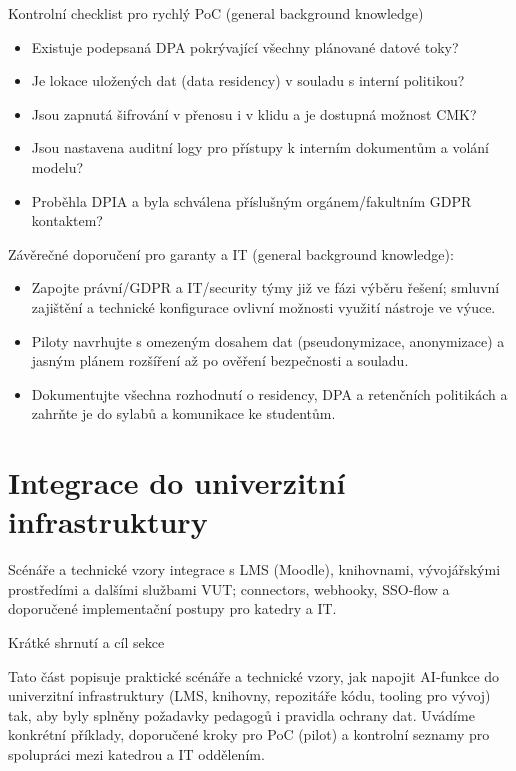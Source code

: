 \documentclass{report}%
\begin{document}
Kontrolní checklist pro rychlý PoC (general background knowledge)
\begin{itemize}
  \item Existuje podepsaná DPA pokrývající všechny plánované datové toky?
  \item Je lokace uložených dat (data residency) v souladu s interní politikou?
  \item Jsou zapnutá šifrování v přenosu i v klidu a je dostupná možnost CMK?
  \item Jsou nastavena auditní logy pro přístupy k interním dokumentům a volání modelu?
  \item Proběhla DPIA a byla schválena příslušným orgánem/fakultním GDPR kontaktem?
\end{itemize}

Závěrečné doporučení pro garanty a IT (general background knowledge):
\begin{itemize}
  \item Zapojte právní/GDPR a IT/security týmy již ve fázi výběru řešení; smluvní zajištění a technické konfigurace ovlivní možnosti využití nástroje ve výuce.
  \item Piloty navrhujte s omezeným dosahem dat (pseudonymizace, anonymizace) a jasným plánem rozšíření až po ověření bezpečnosti a souladu.
  \item Dokumentujte všechna rozhodnutí o residency, DPA a retenčních politikách a zahrňte je do sylabů a komunikace ke studentům.
\end{itemize}%

%
\section{Integrace do univerzitní infrastruktury}%
Scénáře a technické vzory integrace s LMS (Moodle), knihovnami, vývojářskými prostředími a dalšími službami VUT; connectors, webhooky, SSO‑flow a doporučené implementační postupy pro katedry a IT.%


%
Krátké shrnutí a cíl sekce

Tato část popisuje praktické scénáře a technické vzory, jak napojit AI‑funkce do univerzitní infrastruktury (LMS, knihovny, repozitáře kódu, tooling pro vývoj) tak, aby byly splněny požadavky pedagogů i pravidla ochrany dat. Uvádíme konkrétní příklady, doporučené kroky pro PoC (pilot) a kontrolní seznamy pro spolupráci mezi katedrou a IT oddělením.
\end{document}
